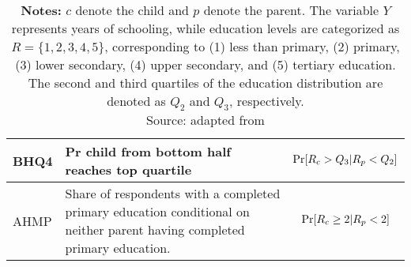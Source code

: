 \begin{table}[h!]
{\begin{tabular}{|m{}|m{}|m{}|}
    \hline
    \centering BHQ4 & \raggedright Pr child from bottom half reaches top quartile & \centering
    \begin{equation*}
    \operatorname{Pr}[ R_{c}  >Q_{3} |R_{p} < Q_{2}]
    \vspace{-1em}\end{equation*} \tabularnewline
    \hline
    \centering AHMP & \raggedright Share of respondents with a completed primary education conditional on neither parent having completed primary education. & \centering
    \begin{equation*}
    \operatorname{Pr}[ R_{c} \geq 2|R_{p} < 2]
    \vspace{-1em}\end{equation*} \tabularnewline
    \hline
    \end{tabular}
}
    \vspace{0.2cm}
    \label{tab:measures}
    \captionsetup{font=footnotesize}
    \caption*{\textbf{Notes:} \( c \) denote the child and \( p \) denote the parent. The variable \( Y \) represents years of schooling, while education levels are categorized as \( R = \{1,2,3,4,5\} \), corresponding to (1) less than primary, (2) primary, (3) lower secondary, (4) upper secondary, and (5) tertiary education. The second and third quartiles of the education distribution are denoted as \( Q_2 \) and \( Q_3 \), respectively.\\
    Source: adapted from \citet{van2024intergenerational}}
\end{table}
